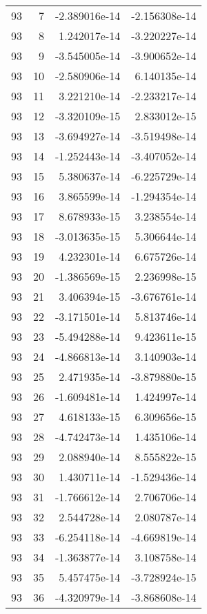 \begin{tabular}{rrrr}
  93 &    7 & -2.389016e-14 & -2.156308e-14 \\
  93 &    8 &  1.242017e-14 & -3.220227e-14 \\
  93 &    9 & -3.545005e-14 & -3.900652e-14 \\
  93 &   10 & -2.580906e-14 &  6.140135e-14 \\
  93 &   11 &  3.221210e-14 & -2.233217e-14 \\
  93 &   12 & -3.320109e-15 &  2.833012e-15 \\
  93 &   13 & -3.694927e-14 & -3.519498e-14 \\
  93 &   14 & -1.252443e-14 & -3.407052e-14 \\
  93 &   15 &  5.380637e-14 & -6.225729e-14 \\
  93 &   16 &  3.865599e-14 & -1.294354e-14 \\
  93 &   17 &  8.678933e-15 &  3.238554e-14 \\
  93 &   18 & -3.013635e-15 &  5.306644e-14 \\
  93 &   19 &  4.232301e-14 &  6.675726e-14 \\
  93 &   20 & -1.386569e-15 &  2.236998e-15 \\
  93 &   21 &  3.406394e-15 & -3.676761e-14 \\
  93 &   22 & -3.171501e-14 &  5.813746e-14 \\
  93 &   23 & -5.494288e-14 &  9.423611e-15 \\
  93 &   24 & -4.866813e-14 &  3.140903e-14 \\
  93 &   25 &  2.471935e-14 & -3.879880e-15 \\
  93 &   26 & -1.609481e-14 &  1.424997e-14 \\
  93 &   27 &  4.618133e-15 &  6.309656e-15 \\
  93 &   28 & -4.742473e-14 &  1.435106e-14 \\
  93 &   29 &  2.088940e-14 &  8.555822e-15 \\
  93 &   30 &  1.430711e-14 & -1.529436e-14 \\
  93 &   31 & -1.766612e-14 &  2.706706e-14 \\
  93 &   32 &  2.544728e-14 &  2.080787e-14 \\
  93 &   33 & -6.254118e-14 & -4.669819e-14 \\
  93 &   34 & -1.363877e-14 &  3.108758e-14 \\
  93 &   35 &  5.457475e-14 & -3.728924e-15 \\
  93 &   36 & -4.320979e-14 & -3.868608e-14 \\

\end{tabular}
